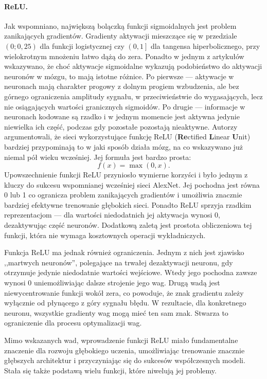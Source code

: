 \paragraph{ReLU.}
Jak wspomniano, największą bolączką funkcji sigmoidalnych jest problem zanikających gradientów. Gradienty aktywacji mieszczące się w przedziale \( \left(0; 0,25\right)\) dla funkcji logistycznej czy \( \left(0, 1\right]\) dla tangensa hiperbolicznego, przy wielokrotnym mnożeniu łatwo dążą do zera. Ponadto w jednym z artykułów wskazywano, że choć aktywacje sigmoidalne wykazują podobieństwo do aktywacji neuronów w mózgu, to mają istotne różnice\cite{rectifier}. Po pierwsze --- aktywacje w neuronach mają charakter progowy z dolnym progiem wzbudzenia, ale bez górnego ograniczenia amplitudy sygnału, w przeciwieństwie do wygasających, lecz nie osiągających wartości granicznych sigmoidów. Po drugie --- informacje w neuronach kodowane są rzadko i w jednym momencie jest aktywna jedynie niewielka ich część, podczas gdy pozostałe pozostają nieaktywne. Autorzy argumentowali, że sieci wykorzystujące funkcję ReLU (\textbf{Re}ctified \textbf{L}inear \textbf{U}nit) bardziej przypominają to w jaki sposób działa mózg, na co wskazywano już niemal pół wieku wcześniej\cite{4082265}. Jej formuła jest bardzo prosta:
\[ f(x) = \max(0, x). \]
Upowszechnienie funkcji ReLU przyniosło wymierne korzyści i było jednym z kluczy do sukcesu wspomnianej wcześniej sieci AlexNet. Jej pochodna jest równa 0 lub 1 co ogranicza problem zanikających gradientów i umożliwia znacznie bardziej efektywne trenowanie głębokich sieci. Ponadto ReLU sprzyja rzadkim reprezentacjom --- dla wartości niedodatnich jej aktywacja wynosi 0, dezaktywując część neuronów. Dodatkową zaletą jest prostota obliczeniowa tej funkcji, która nie wymaga kosztownych operacji wykładniczych.

Funkcja ReLU ma jednak również ograniczenia. Jednym z nich jest zjawisko ,,martwych neuronów'', polegające na trwałej dezaktywacji neuronu, gdy otrzymuje jedynie niedodatnie wartości wejściowe. Wtedy jego pochodna zawsze wynosi 0 uniemożliwiając dalsze strojenie jego wag. Drugą wadą jest niewycentrowanie funkcji wokół zera, co powoduje, że znak gradientu zależy wyłącznie od płynącego z góry sygnału błędu. W rezultacie, dla konkretnego neuronu, wszystkie gradienty wag mogą mieć ten sam znak. Stwarza to ograniczenie dla procesu optymalizacji wag.

Mimo wskazanych wad, wprowadzenie funkcji ReLU miało fundamentalne znaczenie dla rozwoju głębokiego uczenia, umożliwiając trenowanie znacznie głębszych architektur i przyczyniając się do sukcesów współczesnych modeli. Stała się także podstawą wielu funkcji, które niwelują jej problemy.
